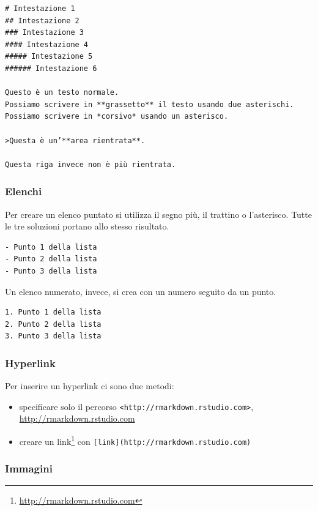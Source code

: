 \documentclass[
  11pt,
]{krantz}
\providecommand{\tightlist}{%
  \setlength{\itemsep}{0pt}\setlength{\parskip}{0pt}}
\renewcommand{\href}[2]{#2\footnote{\url{#1}}}
\theoremstyle{definition}
\theoremstyle{definition}
\theoremstyle{definition}
\theoremstyle{definition}
\theoremstyle{remark}
\begin{document}
\begin{verbatim}
# Intestazione 1
## Intestazione 2
### Intestazione 3
#### Intestazione 4
##### Intestazione 5
###### Intestazione 6

Questo è un testo normale.
Possiamo scrivere in **grassetto** il testo usando due asterischi.
Possiamo scrivere in *corsivo* usando un asterisco.

>Questa è un’**area rientrata**.

Questa riga invece non è più rientrata.
\end{verbatim}

\hypertarget{elenchi}{%
\subsubsection{Elenchi}\label{elenchi}}

Per creare un elenco puntato si utilizza il segno più, il trattino o l'asterisco. Tutte le tre soluzioni portano allo stesso risultato.

\begin{verbatim}
- Punto 1 della lista
- Punto 2 della lista
- Punto 3 della lista
\end{verbatim}

Un elenco numerato, invece, si crea con un numero seguito da un punto.

\begin{verbatim}
1. Punto 1 della lista
2. Punto 2 della lista
3. Punto 3 della lista
\end{verbatim}

\hypertarget{hyperlink}{%
\subsubsection{Hyperlink}\label{hyperlink}}

Per inserire un hyperlink ci sono due metodi:

\begin{itemize}
\tightlist
\item
  specificare solo il percorso \texttt{\textless{}http://rmarkdown.rstudio.com\textgreater{}}, \url{http://rmarkdown.rstudio.com}\\
\item
  creare un \href{http://rmarkdown.rstudio.com}{link} con \texttt{{[}link{]}(http://rmarkdown.rstudio.com)}\\
\end{itemize}

\hypertarget{immagini}{%
\subsubsection{Immagini}\label{immagini}}
\end{document}
